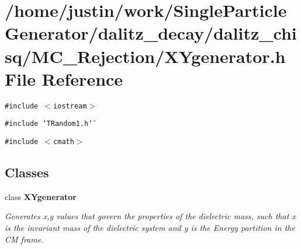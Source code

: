 \section{/home/justin/work/Single\-Particle\-Generator/dalitz\_\-decay/dalitz\_\-chisq/MC\_\-Rejection/XYgenerator.h File Reference}
\label{XYgenerator_8h}
{\tt \#include $<$iostream$>$}\par
{\tt \#include \char`\"{}TRandom1.h\char`\"{}}\par
{\tt \#include $<$cmath$>$}\par
\subsection*{Classes}
\begin{CompactItemize}
\item 
class \bf{XYgenerator}
\begin{CompactList}\small\item\em Generates x,y values that govern the properties of the dielectric mass, such that x is the invariant mass of the dielectric system and y is the Energy partition in the CM frame. \item\end{CompactList}\end{CompactItemize}

